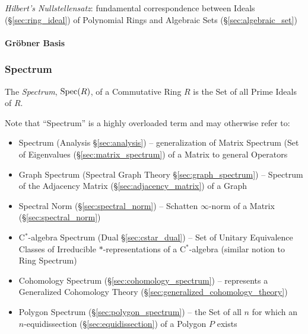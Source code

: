 \begin{itemize}
\emph{Hilbert's Nullstellensatz}: fundamental correspondence between Ideals
(\S\ref{sec:ring_ideal}) of Polynomial Rings and Algebraic Sets
(\S\ref{sec:algebraic_set})



\paragraph{Gr\"obner Basis}\label{sec:grobner_basis}\hfill




\subsubsection{Spectrum}\label{sec:ring_spectrum}

The \emph{Spectrum}, $\mathrm{Spec}(R)$, of a Commutative Ring $R$ is the Set of all
Prime Ideals of $R$.

\fist Note that ``Spectrum'' is a highly overloaded term and may otherwise
refer to:
\begin{itemize}
  \item Spectrum (Analysis \S\ref{sec:analysis}) -- generalization of Matrix
    Spectrum (Set of Eigenvalues (\S\ref{sec:matrix_spectrum}) of a Matrix to
    general Operators

  \item Graph Spectrum (Spectral Graph Theory \S\ref{sec:graph_spectrum}) --
    Spectrum of the Adjacency Matrix (\S\ref{sec:adjacency_matrix}) of a Graph

  \item Spectral Norm (\S\ref{sec:spectral_norm}) -- Schatten $\infty$-norm of
    a Matrix (\S\ref{sec:spectral_norm})

  \item C$^*$-algebra Spectrum (Dual \S\ref{sec:cstar_dual}) -- Set of Unitary
    Equivalence Classes of Irreducible $*$-representations of a C$^*$-algebra
    (similar notion to Ring Spectrum)

  \item Cohomology Spectrum (\S\ref{sec:cohomology_spectrum}) -- represents a
    Generalized Cohomology Theory (\S\ref{sec:generalized_cohomology_theory})

  \item Polygon Spectrum (\S\ref{sec:polygon_spectrum}) -- the Set of all $n$
    for which an $n$-equidissection (\S\ref{sec:equidissection}) of a Polygon
    $P$ exists


\end{itemize}
\end{itemize}
